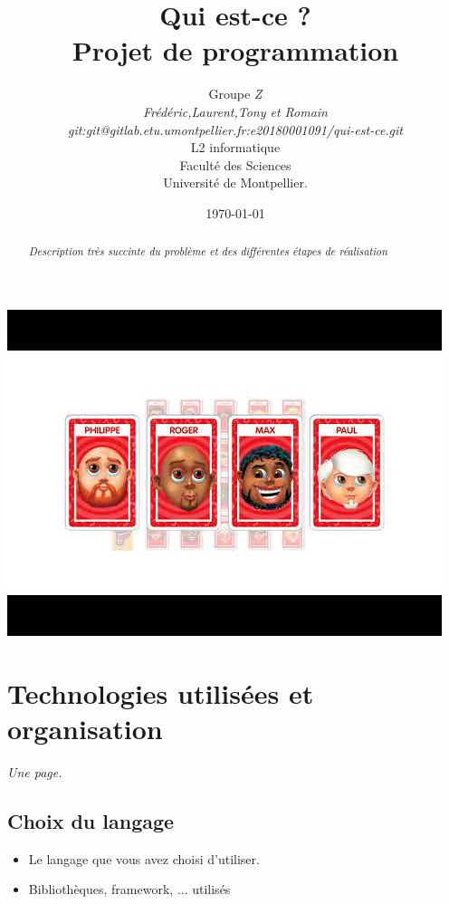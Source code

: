 \documentclass[a4paper]{article}
\title{  Qui est-ce ?\\         %
  Projet de programmation}
\author{Groupe \emph{Z}\\
  \emph{Frédéric,Laurent,Tony et Romain}\\
  \emph{git:git@gitlab.etu.umontpellier.fr:e20180001091/qui-est-ce.git}\\
  L2 informatique\\
  Faculté des Sciences\\
Université de Montpellier.}
\date{\today}
\begin{document}
\maketitle                    %

\begin{center}               %
  \includegraphics[scale=1]{img.jpg}   %
\end{center}

\begin{abstract}     %

  \emph{Description très succinte du problème et des différentes étapes de réalisation}

\end{abstract}


\section{ Technologies utilisées  et organisation} %

\emph{Une page.}

\subsection{Choix du langage}         %

\begin{itemize}            %
\item
  Le langage que vous avez choisi d'utiliser.
\item
  Bibliothèques, framework, ... utilisés
\end{itemize}
\end{document}
